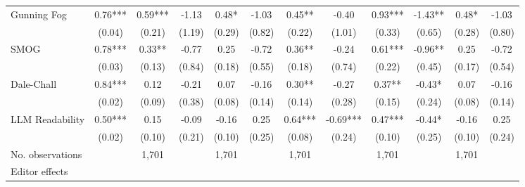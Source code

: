 \begin{table}
\begin{threeparttable}
\begin{tabular}{p{3cm}S@{}S@{}S@{}S@{}S@{}S@{}S@{}S@{}S@{}S@{}S@{}}
            Gunning Fog                   &        0.76***&        0.59***&       -1.13   &        0.48*  &       -1.03   &        0.45** &       -0.40   &        0.93***&       -1.43** &        0.48*  &       -1.03   \\
                                          &      (0.04)   &      (0.21)   &      (1.19)   &      (0.29)   &      (0.82)   &      (0.22)   &      (1.01)   &      (0.33)   &      (0.65)   &      (0.28)   &      (0.80)   \\
            SMOG                          &        0.78***&        0.33** &       -0.77   &        0.25   &       -0.72   &        0.36** &       -0.24   &        0.61***&       -0.96** &        0.25   &       -0.72   \\
                                          &      (0.03)   &      (0.13)   &      (0.84)   &      (0.18)   &      (0.55)   &      (0.18)   &      (0.74)   &      (0.22)   &      (0.45)   &      (0.17)   &      (0.54)   \\
            Dale-Chall                    &        0.84***&        0.12   &       -0.21   &        0.07   &       -0.16   &        0.30** &       -0.27   &        0.37** &       -0.43*  &        0.07   &       -0.16   \\
                                          &      (0.02)   &      (0.09)   &      (0.38)   &      (0.08)   &      (0.14)   &      (0.14)   &      (0.28)   &      (0.15)   &      (0.24)   &      (0.08)   &      (0.14)   \\
            LLM Readability               &        0.50***&        0.15   &       -0.09   &       -0.16   &        0.25   &        0.64***&       -0.69***&        0.47***&       -0.44*  &       -0.16   &        0.25   \\
                                          &      (0.02)   &      (0.10)   &      (0.21)   &      (0.10)   &      (0.25)   &      (0.08)   &      (0.24)   &      (0.10)   &      (0.25)   &      (0.10)   &      (0.24)   \\
            \midrule
            No. observations              &               &       1,701   &               &       1,701   &               &       1,701   &               &       1,701   &               &       1,701   &               \\
            \midrule
            Editor effects       &               &           {}   &               &           {}   &               &           {}   &               &           {}   &               &               &               \\

\end{tabular}
\end{threeparttable}
\end{table}
